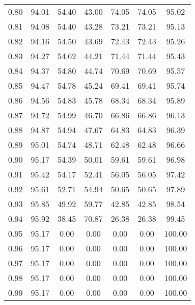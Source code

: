 \begin{tabular}{|c|c|c|c|c|c|c|}
      0.80 &     94.01 &     54.40 &      43.00 &   74.05 &      74.05 &         95.02 \\
      0.81 &     94.08 &     54.40 &      43.28 &   73.21 &      73.21 &         95.13 \\
      0.82 &     94.16 &     54.50 &      43.69 &   72.43 &      72.43 &         95.26 \\
      0.83 &     94.27 &     54.62 &      44.21 &   71.44 &      71.44 &         95.43 \\
      0.84 &     94.37 &     54.80 &      44.74 &   70.69 &      70.69 &         95.57 \\
      0.85 &     94.47 &     54.78 &      45.24 &   69.41 &      69.41 &         95.74 \\
      0.86 &     94.56 &     54.83 &      45.78 &   68.34 &      68.34 &         95.89 \\
      0.87 &     94.72 &     54.99 &      46.70 &   66.86 &      66.86 &         96.13 \\
      0.88 &     94.87 &     54.94 &      47.67 &   64.83 &      64.83 &         96.39 \\
      0.89 &     95.01 &     54.74 &      48.71 &   62.48 &      62.48 &         96.66 \\
      0.90 &     95.17 &     54.39 &      50.01 &   59.61 &      59.61 &         96.98 \\
      0.91 &     95.42 &     54.17 &      52.41 &   56.05 &      56.05 &         97.42 \\
      0.92 &     95.61 &     52.71 &      54.94 &   50.65 &      50.65 &         97.89 \\
      0.93 &     95.85 &     49.92 &      59.77 &   42.85 &      42.85 &         98.54 \\
      0.94 &     95.92 &     38.45 &      70.87 &   26.38 &      26.38 &         99.45 \\
      0.95 &     95.17 &      0.00 &       0.00 &    0.00 &       0.00 &        100.00 \\
      0.96 &     95.17 &      0.00 &       0.00 &    0.00 &       0.00 &        100.00 \\
      0.97 &     95.17 &      0.00 &       0.00 &    0.00 &       0.00 &        100.00 \\
      0.98 &     95.17 &      0.00 &       0.00 &    0.00 &       0.00 &        100.00 \\
      0.99 &     95.17 &      0.00 &       0.00 &    0.00 &       0.00 &        100.00 \\
\bottomrule
\end{tabular}
